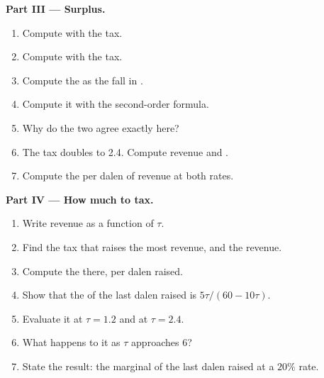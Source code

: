 \begin{problem}
\medskip\noindent\textbf{Part III --- Surplus.}
\begin{enumerate}[resume]
  \item Compute  with the tax.
  \item Compute  with the tax.
  \item Compute the  as the fall in .
  \item Compute it with the second-order formula.
  \item Why do the two agree exactly here?
  \item The tax doubles to 2.4. Compute revenue and .
  \item Compute the  per dalen of revenue at both rates.
\end{enumerate}

\medskip\noindent\textbf{Part IV --- How much to tax.}
\begin{enumerate}[resume]
  \item Write revenue as a function of $\tau$.
  \item Find the tax that raises the most revenue, and the revenue.
  \item Compute the  there, per dalen raised.
  \item Show that the  of the last dalen raised is $5\tau/(60 - 10\tau)$.
  \item Evaluate it at $\tau = 1.2$ and at $\tau = 2.4$.
  \item What happens to it as $\tau$ approaches 6?
  \item State the result: the marginal  of the last dalen raised at a $20\%$ rate.
\end{enumerate}
\end{problem}
